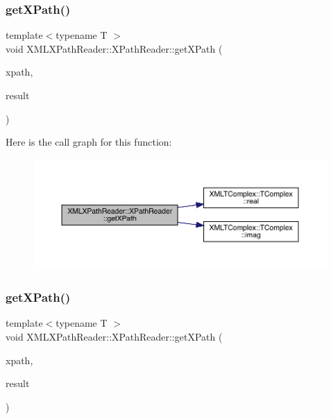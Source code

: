 \subsubsection{\texorpdfstring{getXPath()}{getXPath()}\hspace{0.1cm}{\footnotesize\ttfamily [6/9]}}
{\footnotesize\ttfamily template$<$typename T $>$ \\
void X\+M\+L\+X\+Path\+Reader\+::\+X\+Path\+Reader\+::get\+X\+Path (\begin{DoxyParamCaption}\item[{const std\+::string \&}]{xpath,  }\item[{\mbox{\hyperlink{classXMLTComplex_1_1TComplex}{X\+M\+L\+T\+Complex\+::\+T\+Complex}}$<$ T $>$ \&}]{result }\end{DoxyParamCaption})\hspace{0.3cm}{\ttfamily [inline]}}

Here is the call graph for this function\+:
\nopagebreak
\begin{figure}[H]
\begin{center}
\leavevmode
\includegraphics[width=350pt]{d3/d5a/classXMLXPathReader_1_1XPathReader_a82579390a7b37879a7a7d9b79934a592_cgraph}
\end{center}
\end{figure}
\mbox{\label{classXMLXPathReader_1_1XPathReader_a2c16b804ab7842a5bab7a8fe3f433437}} 
\subsubsection{\texorpdfstring{getXPath()}{getXPath()}\hspace{0.1cm}{\footnotesize\ttfamily [7/9]}}
{\footnotesize\ttfamily template$<$typename T $>$ \\
void X\+M\+L\+X\+Path\+Reader\+::\+X\+Path\+Reader\+::get\+X\+Path (\begin{DoxyParamCaption}\item[{const std\+::string \&}]{xpath,  }\item[{\mbox{\hyperlink{classXMLArray_1_1Array}{Array}}$<$ T $>$ \&}]{result }\end{DoxyParamCaption})\hspace{0.3cm}{\ttfamily [inline]}}

